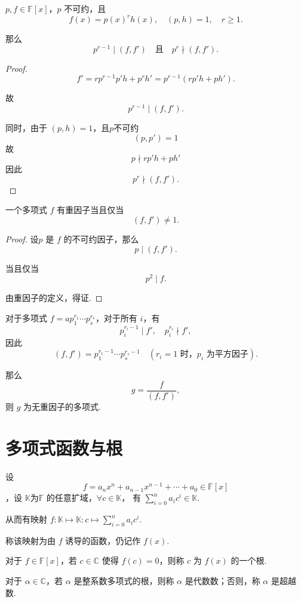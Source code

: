 \begin{proposition}
	\( p, f \in \mathbb{F}[x] \)，\( p \) 不可约，且
	\[ f(x) = p(x)^r h(x), \quad (p, h) = 1, \quad r \geq 1. \]
	
	那么
	\[ p^{r-1} \mid (f, f') \quad \text{且} \quad p^r \nmid (f, f'). \]
	
\end{proposition}
\begin{proof}
	\[ f' = r p^{r-1} p' h + p^r h' = p^{r-1} (r p' h + p h'). \]
	
	故
	\[ p^{r-1} \mid (f, f'). \]
	
	同时，由于 \( (p, h) = 1 \)，且$p$不可约
	\[(p,p')=1\]
	故
	\[ p\nmid r p' h + p h' \]
	因此
	\[ p^r \nmid (f, f'). \]
	

\end{proof}
\begin{corollary}\label{1.3.20}
	一个多项式 \( f \) 有重因子当且仅当
	\[ (f, f') \neq 1. \]
	
\end{corollary}
\begin{proof}
	设\( p \) 是 \( f \) 的不可约因子，那么
	\[ p \mid (f, f'). \]
	
	当且仅当
	\[ p^2 \mid f. \]
	
	由重因子的定义，得证.
	
\end{proof}

对于多项式 \( f = a p_1^{r_1} \cdots p_s^{r_s} \)，对于所有 \( i \)，有
\[ p_i^{r_i - 1} \mid f', \quad p_i^{r_i} \nmid f', \]
因此
\[ (f, f') = p_1^{r_1 - 1} \cdots p_s^{r_s - 1} \quad (r_i = 1 \text{ 时，} p_i \text{ 为平方因子}). \]

那么
\[ g = \frac{f}{(f, f')}, \]
则 \( g \) 为无重因子的多项式.
\section{多项式函数与根}
\begin{definition}\label{p1:concept:c1-l991}
	设 \[ f = a_n x^n + a_{n-1} x^{n-1} + \cdots + a_0 \in \mathbb{F}[x]\]，设 \(\mathbb{K}\text{为} \mathbb{F} \) 的任意扩域，\( \forall c \in \mathbb{K} \)， 有 \( \sum\limits_{i=0}^n a_i c^i \in \mathbb{K} \).
	
	从而有映射 \( f: \mathbb{K} \mapsto \mathbb{K}: c \mapsto \sum\limits_{i=0}^n a_i c^i \).
	
	称该映射为由 \( f \) 诱导的函数，仍记作 \( f(x) \).
	
	对于 \( f \in \mathbb{F}[x] \)，若 \( c \in \mathbb{C} \) 使得 \( f(c) = 0 \)，则称 \( c \) 为 \( f(x) \) 的一个根.
	
	对于 \( \alpha \in \mathbb{C} \)，若 \( \alpha \) 是整系数多项式的根，则称 \( \alpha \) 是代数数；否则，称 \( \alpha \) 是超越数.
\end{definition}


